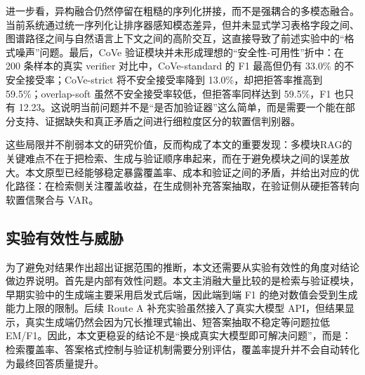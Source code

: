 进一步看，异构融合仍然停留在粗糙的序列化拼接，而不是强耦合的多模态融合。当前系统通过统一序列化让排序器感知模态差异，但并未显式学习表格字段之间、图谱路径之间与自然语言上下文之间的高阶交互，这直接导致了前述实验中的“格式噪声”问题。最后，CoVe 验证模块并未形成理想的“安全性-可用性”折中：在 200 条样本的真实 verifier 对比中，CoVe-standard 的 F1 最高但仍有 33.0\% 的不安全接受率；CoVe-strict 将不安全接受率降到 13.0\%，却把拒答率推高到 59.5\%；overlap-soft 虽然不安全接受率较低，但拒答率同样达到 59.5\%，F1 也只有 12.23。这说明当前问题并不是“是否加验证器”这么简单，而是需要一个能在部分支持、证据缺失和真正矛盾之间进行细粒度区分的软置信判别器。

\begin{table}[!htbp]
\centering
\caption{当前系统仍需改进的典型问题}
\label{tab:error_types}
\small
{}
\end{table}

这些局限并不削弱本文的研究价值，反而构成了本文的重要发现：多模块RAG的关键难点不在于把检索、生成与验证顺序串起来，而在于避免模块之间的误差放大。本文原型已经能够稳定暴露覆盖率、成本和验证之间的矛盾，并给出对应的优化路径：在检索侧关注覆盖收益，在生成侧补充答案抽取，在验证侧从硬拒答转向软置信聚合与 VAR。

\subsection{实验有效性与威胁}

为了避免对结果作出超出证据范围的推断，本文还需要从实验有效性的角度对结论做边界说明。首先是内部有效性问题。本文主消融大量比较的是检索与验证模块，早期实验中的生成端主要采用启发式后端，因此端到端 F1 的绝对数值会受到生成能力上限的限制。后续 Route A 补充实验虽然接入了真实大模型 API，但结果显示，真实生成端仍然会因为冗长推理式输出、短答案抽取不稳定等问题拉低 EM/F1。因此，本文更稳妥的结论不是“换成真实大模型即可解决问题”，而是：检索覆盖率、答案格式控制与验证机制需要分别评估，覆盖率提升并不会自动转化为最终回答质量提升。

